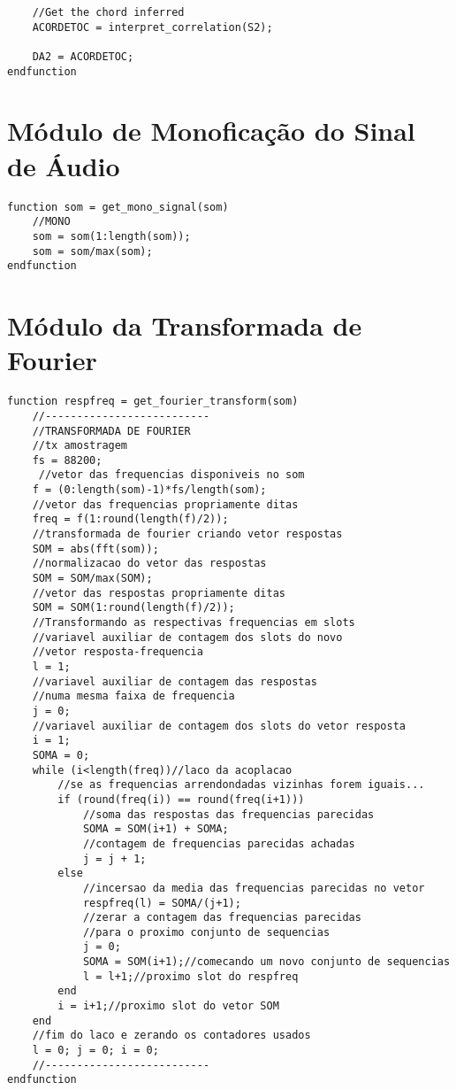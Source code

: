 \begin{anexosenv}
\begin{lstlisting}
	//Get the chord inferred
	ACORDETOC = interpret_correlation(S2);

	DA2 = ACORDETOC;
endfunction
\end{lstlisting}

\section{Módulo de Monoficação do Sinal de Áudio}
\label{sec:modulomonoficacao}
\begin{lstlisting} 
function som = get_mono_signal(som)
	//MONO
	som = som(1:length(som));
	som = som/max(som);
endfunction
\end{lstlisting}

\section{Módulo da Transformada de Fourier}
\label{sec:modulotransformadafourier}
\begin{lstlisting} 
function respfreq = get_fourier_transform(som)
    //--------------------------
    //TRANSFORMADA DE FOURIER
    //tx amostragem
    fs = 88200; 
     //vetor das frequencias disponiveis no som
    f = (0:length(som)-1)*fs/length(som);
    //vetor das frequencias propriamente ditas
    freq = f(1:round(length(f)/2)); 
    //transformada de fourier criando vetor respostas
    SOM = abs(fft(som));
    //normalizacao do vetor das respostas 
    SOM = SOM/max(SOM); 
    //vetor das respostas propriamente ditas
    SOM = SOM(1:round(length(f)/2)); 
    //Transformando as respectivas frequencias em slots
    //variavel auxiliar de contagem dos slots do novo 
    //vetor resposta-frequencia
    l = 1; 
    //variavel auxiliar de contagem das respostas 
    //numa mesma faixa de frequencia
    j = 0; 
    //variavel auxiliar de contagem dos slots do vetor resposta
    i = 1; 
    SOMA = 0; 
    while (i<length(freq))//laco da acoplacao
    	//se as frequencias arrendondadas vizinhas forem iguais...
        if (round(freq(i)) == round(freq(i+1)))
        	//soma das respostas das frequencias parecidas
            SOMA = SOM(i+1) + SOMA;
            //contagem de frequencias parecidas achadas
            j = j + 1;
        else
        	//incersao da media das frequencias parecidas no vetor 
            respfreq(l) = SOMA/(j+1);
            //zerar a contagem das frequencias parecidas 
            //para o proximo conjunto de sequencias
            j = 0;
            SOMA = SOM(i+1);//comecando um novo conjunto de sequencias
            l = l+1;//proximo slot do respfreq
        end
        i = i+1;//proximo slot do vetor SOM   
    end
    //fim do laco e zerando os contadores usados
    l = 0; j = 0; i = 0;
    //--------------------------
endfunction
\end{lstlisting}


\end{anexosenv}
